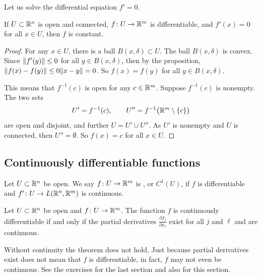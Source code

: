 Let us solve the differential equation $f' = 0$.

\begin{cor}
If $U \subset {\mathbb{R}}^n$ is open and connected, $f \colon U \to {\mathbb{R}}^m$ is
differentiable,
and $f'(x) = 0$ for all $x \in U$, then $f$ is constant.
\end{cor}

\begin{proof}
For any $x \in U$, there is a ball $B(x,\delta) \subset U$.  The ball
$B(x,\delta)$ is convex.  Since
$\lVert {f'(y)} \rVert \leq 0$ for all $y \in B(x,\delta)$, then by the proposition,
$\lVert {f(x)-f(y)} \rVert \leq 0 \lVert {x-y} \rVert = 0$.  So $f(x) = f(y)$ for all $y \in
B(x,\delta)$.

This means that $f^{-1}(c)$ is open for any $c \in {\mathbb{R}}^m$.  Suppose
$f^{-1}(c)$ is nonempty.  
The two sets
\begin{equation*}
U' = f^{-1}(c), \qquad U'' = f^{-1}\bigl({\mathbb{R}}^m\setminus\{c\}\bigr)
\end{equation*}
are open and disjoint, and further $U = U' \cup U''$.  As $U'$ is nonempty
and $U$ is connected, then
$U'' = \emptyset$.  So $f(x) = c$ for all $x \in U$.
\end{proof}

\subsection{Continuously differentiable functions}

\begin{defn}
Let $U \subset {\mathbb{R}}^n$ be open.
We say $f \colon U \to {\mathbb{R}}^m$ is
\emph{},
or $C^1(U)$,
if $f$ is differentiable and $f' \colon U \to L({\mathbb{R}}^n,{\mathbb{R}}^m)$
is continuous.
\end{defn}

\begin{prop} \label{mv:prop:contdiffpartials}
Let $U \subset {\mathbb{R}}^n$ be open and
$f \colon U \to {\mathbb{R}}^m$.  The function
$f$ is continuously differentiable if and only if 
the partial derivatives $\frac{\partial f_j}{\partial x_\ell}$
exist for all $j$ and $\ell$ and are continuous.
\end{prop}

Without continuity the theorem does not hold.  Just because
partial derivatives exist does not mean that $f$ is differentiable,
in fact, $f$ may not even be continuous.  See the exercises
for the last section and also for this section.

